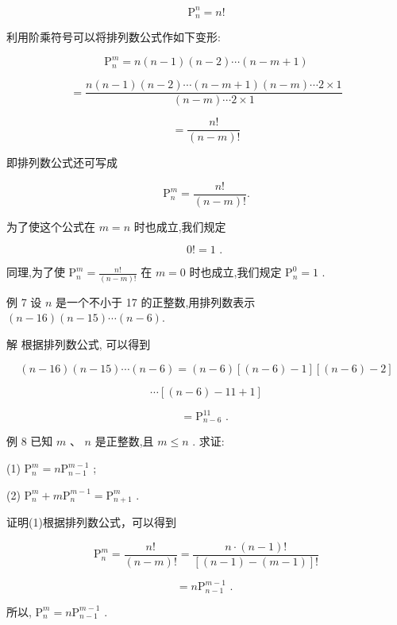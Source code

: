 \documentclass[10pt]{article}
\begin{document}
\[
{\mathrm{P}}_{n}^{n} = n!
\]

利用阶乘符号可以将排列数公式作如下变形:

\[
{\mathrm{P}}_{n}^{m} = n\left( {n - 1}\right) \left( {n - 2}\right) \cdots \left( {n - m + 1}\right)
\]

\[
= \frac{n\left( {n - 1}\right) \left( {n - 2}\right) \cdots \left( {n - m + 1}\right) \left( {n - m}\right) \cdots 2 \times  1}{\left( {n - m}\right) \cdots 2 \times  1}
\]

\[
= \frac{n!}{\left( {n - m}\right) !}
\]

即排列数公式还可写成

\[
{\mathrm{P}}_{n}^{m} = \frac{n!}{\left( {n - m}\right) !}.
\]

为了使这个公式在 \(m = n\) 时也成立,我们规定

\[
0! = 1\text{ . }
\]

同理,为了使 \({\mathrm{P}}_{n}^{m} = \frac{n!}{\left( {n - m}\right) !}\) 在 \(m = 0\) 时也成立,我们规定 \({\mathrm{P}}_{n}^{0} = 1\) .

例 7 设 \(n\) 是一个不小于 17 的正整数,用排列数表示 \(\left( {n - {16}}\right) \left( {n - {15}}\right) \cdots \left( {n - 6}\right) .\)

解 根据排列数公式, 可以得到

\[
\left( {n - {16}}\right) \left( {n - {15}}\right) \cdots \left( {n - 6}\right)  = \left( {n - 6}\right) \left\lbrack  {\left( {n - 6}\right)  - 1}\right\rbrack  \left\lbrack  {\left( {n - 6}\right)  - 2}\right\rbrack
\]

\[
\cdots \left\lbrack  {\left( {n - 6}\right)  - {11} + 1}\right\rbrack
\]

\[
= {\mathrm{P}}_{n - 6}^{11}\text{ . }
\]

例 8 已知 \(m\text{ 、 }n\) 是正整数,且 \(m \leq  n\) . 求证:

(1) \({\mathrm{P}}_{n}^{m} = n{\mathrm{P}}_{n - 1}^{m - 1}\) ;

(2) \({\mathrm{P}}_{n}^{m} + m{\mathrm{P}}_{n}^{m - 1} = {\mathrm{P}}_{n + 1}^{m}\) .

证明(1)根据排列数公式，可以得到

\[
{\mathrm{P}}_{n}^{m} = \frac{n!}{\left( {n - m}\right) !} = \frac{n \cdot  \left( {n - 1}\right) !}{\left\lbrack  {\left( {n - 1}\right)  - \left( {m - 1}\right) }\right\rbrack  !}
\]

\[
= n{\mathrm{P}}_{n - 1}^{m - 1}\text{ . }
\]

所以, \({\mathrm{P}}_{n}^{m} = n{\mathrm{P}}_{n - 1}^{m - 1}\) .
\end{document}
